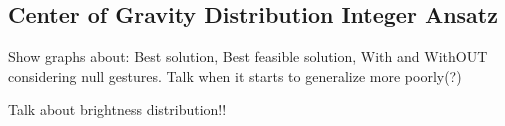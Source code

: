 \subsection{Center of Gravity Distribution Integer Ansatz}
Show graphs about:
Best solution,
Best feasible solution,
With and WithOUT considering null gestures.
Talk when it starts to generalize more poorly(?)

Talk about brightness distribution!!